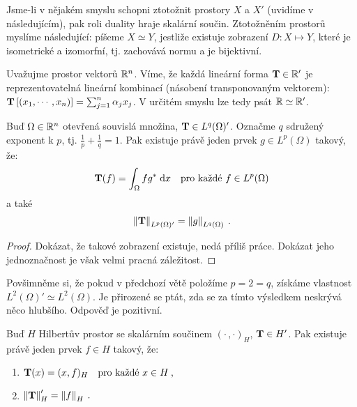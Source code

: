 \begin{remark}
Jsme-li v nějakém smyslu schopni ztotožnit prostory $X$ a $X'$ (uvidíme v následujícím), pak roli duality hraje skalární součin. Ztotožněním prostorů myslíme následující: píšeme $X \simeq Y$, jestliže existuje zobrazení $D: X \mapsto Y$, které je isometrické a izomorfní, tj. zachovává normu a je bijektivní.
\end{remark}

\begin{example}

Uvažujme prostor vektorů $\mathbb{R}^n$. Víme, že každá lineární forma $\mathbf{T} \in \mathbb{R}'$ je reprezentovatelná lineární kombinací (násobení transponovaným vektorem): $\mathbf{T} \left[ (x_1, \cdots, x_n) \right] = \sum_{j=1}^n \alpha_j x_j$. V určitém smyslu lze tedy psát $\mathbb{R} \simeq \mathbb{R}'$. 
\end{example}

\begin{theorem}
Buď $\Omega \in \mathbb{R}^n $ otevřená souvislá množina, $\mathbf{T} \in L^q(\Omega)'$. Označme $q$ sdružený exponent k $p$, tj. $\frac{1}{p} + \frac{1}{q} =1$. Pak existuje právě jeden prvek $g \in L^p(\Omega)$ takový, že:
\begin{align*}
\mathbf{T}(f) = \int_\Omega f g^* \;\mathrm{d}x \quad \text{pro každé } f \in L^p(\Omega)
\end{align*}
a také \begin{align*}
    \left\lVert\mathbf{T}\right\rVert_{L^p(\Omega)'} = \left\lVert g\right\rVert_{L^q(\Omega)} \:.
\end{align*}   
\end{theorem}

\begin{proof}
Dokázat, že takové zobrazení existuje, nedá příliš práce. Dokázat jeho jednoznačnost je však velmi pracná záležitost.
\end{proof}

Povšimněme si, že pokud v předchozí větě položíme $p=2=q$, získáme vlastnost $L^2(\Omega)' \simeq L^2(\Omega)$. Je přirozené se ptát, zda se za tímto výsledkem neskrývá něco hlubšího. Odpověď je pozitivní.

\begin{theorem} \label{4.Riesz-Frechet}
Buď $H$ Hilbertův prostor se skalárním součinem $(\cdot \, , \cdot)_H$, $\mathbf{T} \in H'$.
Pak existuje právě jeden prvek $f \in H $ takový, že:
\begin{enumerate}
    \item $\mathbf{T}(x) = (x,f)_H \quad \text{pro každé } x \in H \:, $
    \item $\left\lVert\mathbf{T}\right\rVert_H'= \left\lVert f\right\rVert_H \:.$
\end{enumerate}
\end{theorem}

